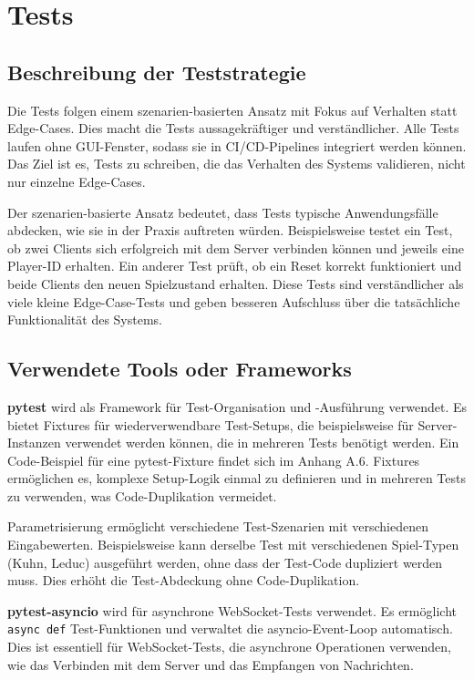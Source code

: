 \section{Tests}\label{sec:tests}

\subsection{Beschreibung der Teststrategie}

Die Tests folgen einem szenarien-basierten Ansatz mit Fokus auf Verhalten statt Edge-Cases.
Dies macht die Tests aussagekräftiger und verständlicher.
Alle Tests laufen ohne GUI-Fenster, sodass sie in CI/CD-Pipelines integriert werden können.
Das Ziel ist es, Tests zu schreiben, die das Verhalten des Systems validieren, nicht nur einzelne Edge-Cases.

Der szenarien-basierte Ansatz bedeutet, dass Tests typische Anwendungsfälle abdecken, wie sie in der Praxis auftreten würden.
Beispielsweise testet ein Test, ob zwei Clients sich erfolgreich mit dem Server verbinden können und jeweils eine Player-ID erhalten.
Ein anderer Test prüft, ob ein Reset korrekt funktioniert und beide Clients den neuen Spielzustand erhalten.
Diese Tests sind verständlicher als viele kleine Edge-Case-Tests und geben besseren Aufschluss über die tatsächliche Funktionalität des Systems.

\subsection{Verwendete Tools oder Frameworks}

\textbf{pytest} wird als Framework für Test-Organisation und -Ausführung verwendet.
Es bietet Fixtures für wiederverwendbare Test-Setups, die beispielsweise für Server-Instanzen verwendet werden können, die in mehreren Tests benötigt werden.
Ein Code-Beispiel für eine pytest-Fixture findet sich im Anhang A.6.
Fixtures ermöglichen es, komplexe Setup-Logik einmal zu definieren und in mehreren Tests zu verwenden, was Code-Duplikation vermeidet.

Parametrisierung ermöglicht verschiedene Test-Szenarien mit verschiedenen Eingabewerten.
Beispielsweise kann derselbe Test mit verschiedenen Spiel-Typen (Kuhn, Leduc) ausgeführt werden, ohne dass der Test-Code dupliziert werden muss.
Dies erhöht die Test-Abdeckung ohne Code-Duplikation.

\textbf{pytest-asyncio} wird für asynchrone WebSocket-Tests verwendet.
Es ermöglicht \texttt{async def} Test-Funktionen und verwaltet die asyncio-Event-Loop automatisch.
Dies ist essentiell für WebSocket-Tests, die asynchrone Operationen verwenden, wie das Verbinden mit dem Server und das Empfangen von Nachrichten.


